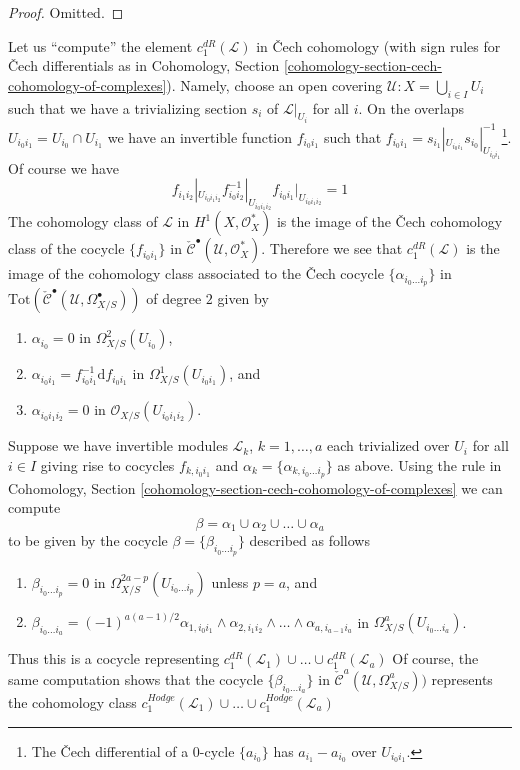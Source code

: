 \begin{proof}
Omitted.
\end{proof}

\noindent
Let us ``compute'' the element $c^{dR}_1(\mathcal{L})$ in {\v C}ech
cohomology (with sign rules for {\v C}ech differentials
as in Cohomology, Section
\ref{cohomology-section-cech-cohomology-of-complexes}).
Namely, choose an open covering
$\mathcal{U} : X = \bigcup_{i \in I} U_i$ such that
we have a trivializing section $s_i$ of $\mathcal{L}|_{U_i}$ for all $i$.
On the overlaps $U_{i_0i_1} = U_{i_0} \cap U_{i_1}$
we have an invertible function $f_{i_0i_1}$ such that
$f_{i_0i_1} = s_{i_1}|_{U_{i_0i_1}} s_{i_0}|_{U_{i_0i_1}}^{-1}$\footnote{The
{\v C}ech differential of a $0$-cycle $\{a_{i_0}\}$ has
$a_{i_1} - a_{i_0}$ over $U_{i_0i_1}$.}.
Of course we have
$$
f_{i_1i_2}|_{U_{i_0i_1i_2}}
f_{i_0i_2}^{-1}|_{U_{i_0i_1i_2}}
f_{i_0i_1}|_{U_{i_0i_1i_2}} = 1
$$
The cohomology class of $\mathcal{L}$ in $H^1(X, \mathcal{O}_X^*)$ is
the image of the {\v C}ech cohomology class of the cocycle $\{f_{i_0i_1}\}$ in
$\check{\mathcal{C}}^\bullet(\mathcal{U}, \mathcal{O}_X^*)$.
Therefore we see that $c_1^{dR}(\mathcal{L})$ is the image
of the cohomology class associated to the {\v C}ech cocycle
$\{\alpha_{i_0 \ldots i_p}\}$ in
$\text{Tot}(\check{\mathcal{C}}^\bullet(\mathcal{U}, \Omega_{X/S}^\bullet))$
of degree $2$ given by
\begin{enumerate}
\item $\alpha_{i_0} = 0$ in $\Omega^2_{X/S}(U_{i_0})$,
\item $\alpha_{i_0i_1} = f_{i_0i_1}^{-1}\text{d}f_{i_0i_1}$ in
$\Omega^1_{X/S}(U_{i_0i_1})$, and
\item $\alpha_{i_0i_1i_2} = 0$ in $\mathcal{O}_{X/S}(U_{i_0i_1i_2})$.
\end{enumerate}
Suppose we have invertible modules $\mathcal{L}_k$, $k = 1, \ldots, a$
each trivialized over $U_i$ for all $i \in I$ giving rise to cocycles
$f_{k, i_0i_1}$ and $\alpha_k = \{\alpha_{k, i_0 \ldots i_p}\}$ as above.
Using the rule in
Cohomology, Section \ref{cohomology-section-cech-cohomology-of-complexes}
we can compute
$$
\beta = \alpha_1 \cup \alpha_2 \cup \ldots \cup \alpha_a
$$
to be given by the cocycle $\beta = \{\beta_{i_0 \ldots i_p}\}$
described as follows
\begin{enumerate}
\item $\beta_{i_0 \ldots i_p} = 0$ in
$\Omega^{2a - p}_{X/S}(U_{i_0 \ldots i_p})$ unless $p = a$, and
\item $\beta_{i_0 \ldots i_a} = (-1)^{a(a - 1)/2}
\alpha_{1, i_0i_1} \wedge \alpha_{2, i_1 i_2} \wedge \ldots \wedge
\alpha_{a, i_{a - 1}i_a}$ in
$\Omega^a_{X/S}(U_{i_0 \ldots i_a})$.
\end{enumerate}
Thus this is a cocycle representing
$c_1^{dR}(\mathcal{L}_1) \cup \ldots \cup c_1^{dR}(\mathcal{L}_a)$
Of course, the same computation shows that the cocycle
$\{\beta_{i_0 \ldots i_a}\}$ in
$\check{\mathcal{C}}^a(\mathcal{U}, \Omega_{X/S}^a))$
represents the cohomology class
$c_1^{Hodge}(\mathcal{L}_1) \cup \ldots \cup c_1^{Hodge}(\mathcal{L}_a)$

